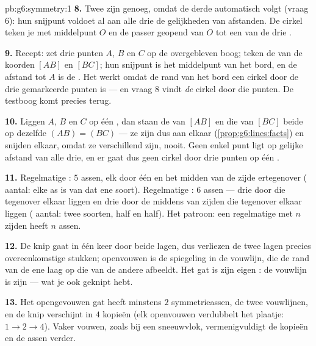 \begin{solution}{pb:g6:symmetry:1}
\textbf{8.} Twee  zijn genoeg, omdat de derde automatisch volgt
(vraag 6): hun snijpunt voldoet al aan alle drie de gelijkheden van afstanden.
De cirkel teken je met middelpunt $O$ en de passer geopend van $O$ tot een van de
drie .

\textbf{9.} Recept: zet drie punten $A$, $B$ en $C$ op de overgebleven boog;
teken de  van de koorden $[AB]$ en $[BC]$; hun snijpunt is het
middelpunt van het bord, en de afstand tot $A$ is de . Het werkt omdat de
rand van het bord een cirkel door de drie gemarkeerde punten is --- en vraag 8
vindt \emph{de} cirkel door die punten. De testboog komt precies terug.

\textbf{10.} Liggen $A$, $B$ en $C$ op één , dan staan de  van
$[AB]$ en die van $[BC]$ beide  op dezelfde  $(AB) = (BC)$ --- ze
zijn dus  aan elkaar (\cref{prop:g6:lines:facts}) en snijden elkaar, omdat
ze verschillend zijn, nooit. Geen enkel punt ligt op gelijke afstand van alle
drie, en er gaat dus geen cirkel door drie punten op één .

\textbf{11.} Regelmatige : $5$ assen, elk door één  en het midden
van de zijde ertegenover ( aantal: elke as is van dat ene soort).
Regelmatige : $6$ assen --- drie door  die tegenover elkaar
liggen en drie door de middens van zijden die tegenover elkaar liggen (
aantal: twee soorten, half en half). Het patroon: een regelmatige  met
$n$ zijden heeft $n$ assen.

\textbf{12.} De knip gaat in één keer door beide lagen, dus verliezen de twee
lagen precies overeenkomstige stukken; openvouwen is de spiegeling in de vouwlijn,
die de rand van de ene laag op die van de andere afbeeldt. Het gat is zijn eigen
: de vouwlijn is zijn  --- wat je ook geknipt hebt.

\textbf{13.} Het opengevouwen gat heeft minstens $2$ symmetrieassen, de twee
vouwlijnen, en de knip verschijnt in $4$ kopieën (elk openvouwen verdubbelt het
plaatje: $1 \to 2 \to 4$). Vaker vouwen, zoals bij een sneeuwvlok, vermenigvuldigt
de kopieën en de assen verder.


\end{solution}
